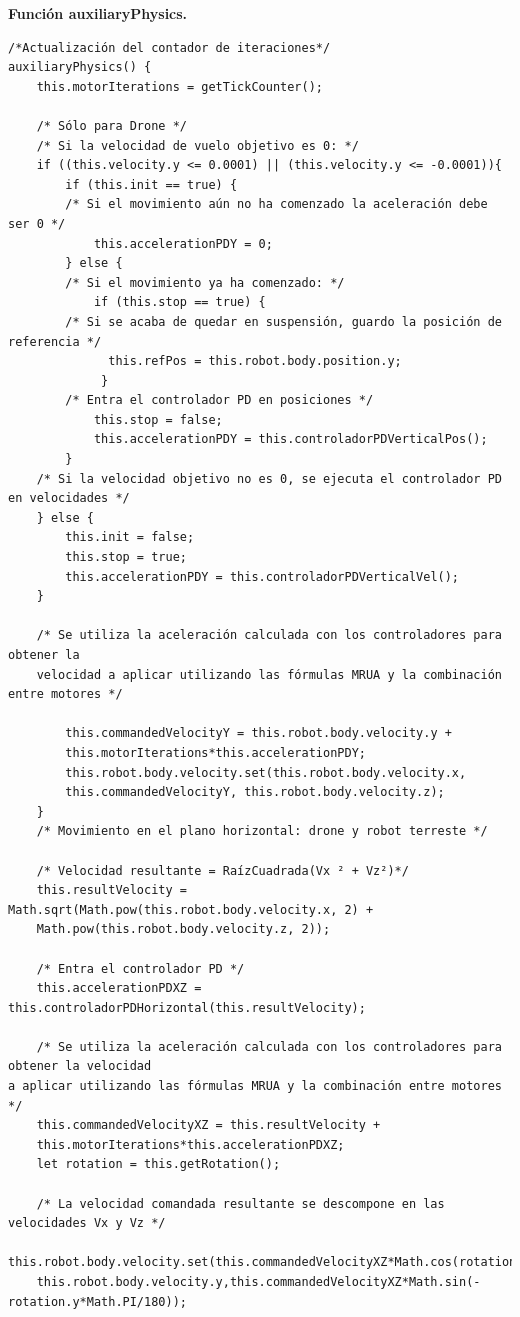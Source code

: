 \normalsize
\textbf{Función auxiliaryPhysics.}

\footnotesize {
\begin{verbatim}
/*Actualización del contador de iteraciones*/
auxiliaryPhysics() {
    this.motorIterations = getTickCounter(); 
               
    /* Sólo para Drone */
    /* Si la velocidad de vuelo objetivo es 0: */
    if ((this.velocity.y <= 0.0001) || (this.velocity.y <= -0.0001)){
        if (this.init == true) {
        /* Si el movimiento aún no ha comenzado la aceleración debe ser 0 */
            this.accelerationPDY = 0;
        } else { 
        /* Si el movimiento ya ha comenzado: */
    	    if (this.stop == true) {
    	/* Si se acaba de quedar en suspensión, guardo la posición de referencia */
    		  this.refPos = this.robot.body.position.y;
    		 }
    	/* Entra el controlador PD en posiciones */
            this.stop = false;
    		this.accelerationPDY = this.controladorPDVerticalPos();
    	}
    /* Si la velocidad objetivo no es 0, se ejecuta el controlador PD en velocidades */
    } else {
        this.init = false;
        this.stop = true;
        this.accelerationPDY = this.controladorPDVerticalVel();
    }
                
    /* Se utiliza la aceleración calculada con los controladores para obtener la 
    velocidad a aplicar utilizando las fórmulas MRUA y la combinación entre motores */
                
        this.commandedVelocityY = this.robot.body.velocity.y + 
        this.motorIterations*this.accelerationPDY;
        this.robot.body.velocity.set(this.robot.body.velocity.x, 
        this.commandedVelocityY, this.robot.body.velocity.z); 
    }
    /* Movimiento en el plano horizontal: drone y robot terreste */
    
    /* Velocidad resultante = RaízCuadrada(Vx ² + Vz²)*/
	this.resultVelocity = Math.sqrt(Math.pow(this.robot.body.velocity.x, 2) + 
	Math.pow(this.robot.body.velocity.z, 2));
	
	/* Entra el controlador PD */
	this.accelerationPDXZ = this.controladorPDHorizontal(this.resultVelocity); 
	
	/* Se utiliza la aceleración calculada con los controladores para obtener la velocidad 
a aplicar utilizando las fórmulas MRUA y la combinación entre motores */
	this.commandedVelocityXZ = this.resultVelocity + 
	this.motorIterations*this.accelerationPDXZ;
	let rotation = this.getRotation();
	
	/* La velocidad comandada resultante se descompone en las velocidades Vx y Vz */
	this.robot.body.velocity.set(this.commandedVelocityXZ*Math.cos(rotation.y*Math.PI/180), 
	this.robot.body.velocity.y,this.commandedVelocityXZ*Math.sin(-rotation.y*Math.PI/180));
	

\end{verbatim}}
